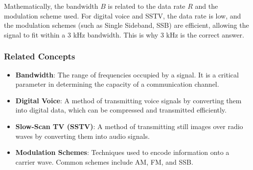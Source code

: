 Mathematically, the bandwidth \( B \) is related to the data rate \( R \) and the modulation scheme used. For digital voice and SSTV, the data rate is low, and the modulation schemes (such as Single Sideband, SSB) are efficient, allowing the signal to fit within a 3 kHz bandwidth. This is why 3 kHz is the correct answer.

\subsubsection{Related Concepts}
\begin{itemize}
    \item \textbf{Bandwidth}: The range of frequencies occupied by a signal. It is a critical parameter in determining the capacity of a communication channel.
    \item \textbf{Digital Voice}: A method of transmitting voice signals by converting them into digital data, which can be compressed and transmitted efficiently.
    \item \textbf{Slow-Scan TV (SSTV)}: A method of transmitting still images over radio waves by converting them into audio signals.
    \item \textbf{Modulation Schemes}: Techniques used to encode information onto a carrier wave. Common schemes include AM, FM, and SSB.
\end{itemize}

